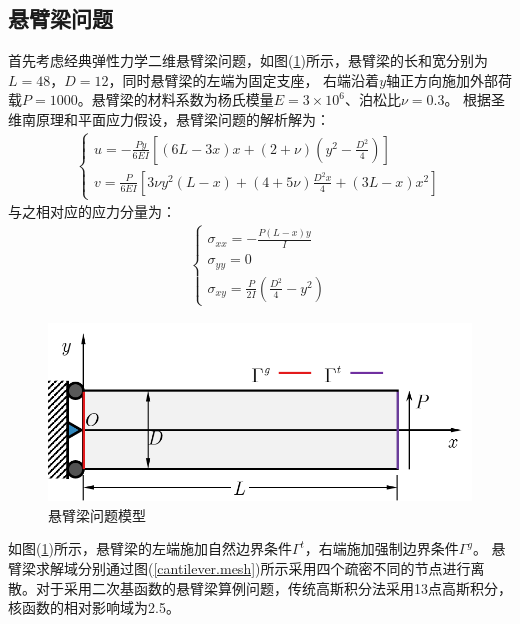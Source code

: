 \subsection{悬臂梁问题}
首先考虑经典弹性力学二维悬臂梁问题，如图(\ref{cantilever})所示，悬臂梁的长和宽分别为$L=48$，$D=12$，同时悬臂梁的左端为固定支座，
右端沿着$y$轴正方向施加外部荷载$P=1000$。悬臂梁的材料系数为杨氏模量$E=3\times10^6$、泊松比$\nu=0.3$。
根据圣维南原理和平面应力假设，悬臂梁问题的解析解为：
\begin{equation}
\begin{split}
\begin{cases}
    u = -\frac{Py}{6EI}[(6L-3x)x + (2+\nu)(y^2 - \frac{D^2}{4})] \\
    v = \frac{P}{6EI}[3\nu y^2(L-x) + (4+5\nu)\frac{D^2x}{4} + (3L-x)x^2]
\end{cases}
\end{split}
\end{equation}
与之相对应的应力分量为：
\begin{equation}
\begin{split}
\begin{cases}
   \sigma_{xx}=-\frac{P(L-x)y}{I}\\
   \sigma_{yy}=0\\
   \sigma_{xy}=\frac{P}{2I}(\frac{D^2}{4}-y^2)
\end{cases}
\end{split}
\end{equation}
\begin{figure}[H]
    \centering
    \includegraphics[scale=0.7]{figure/EHR/cantilever/cantilever.png}
    \caption{悬臂梁问题模型}\label{cantilever}
\end{figure}
如图(\ref{cantilever})所示，悬臂梁的左端施加自然边界条件$\Gamma^t$，右端施加强制边界条件$\Gamma^g$。
悬臂梁求解域分别通过图(\ref{cantilever.mesh})所示采用四个疏密不同的节点进行离散。对于采用二次基函数的悬臂梁算例问题，传统高斯积分法采用13点高斯积分，核函数的相对影响域为2.5。
